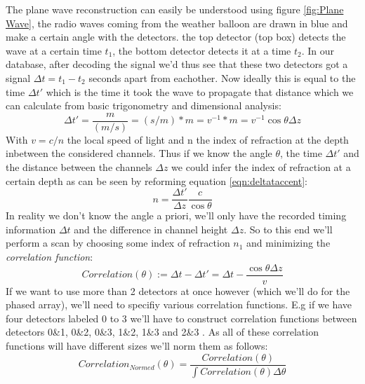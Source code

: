 \documentclass[11pt,a4paper,faculty=we,language=en,doctype=report]{cls/ugent-doc}
\begin{document}
The plane wave reconstruction can easily be understood using figure
\ref{fig:Plane Wave}, the radio waves coming from the weather balloon are drawn
in blue and make a certain angle with the detectors. the top detector (top box)
detects the wave at a certain time $t_1$, the bottom detector detects it at a
time $t_2$. In our database, after decoding the signal we'd thus see that these
two detectors got a signal $\Delta t = t_1 - t_2$ seconds apart from eachother.
Now ideally this is equal to the time $\Delta t'$ which is the time it took the
wave to propagate that distance which we can calculate from basic trigonometry
and dimensional analysis:
\begin{equation}
	\Delta t' = \frac{m}{(m/s)} = (s/m)*m = v^{-1} * m = v^{-1} \cos\theta \Delta z
	\label{eqn:deltataccent}
\end{equation}
With $v = c/n$ the local speed of light and n the index of refraction at the depth inbetween
the considered channels. 
Thus if we know the angle $\theta$, the time $\Delta t'$ and the distance between the channels $\Delta z$
we could infer the index of refraction at a certain depth as can be seen by reforming equation \ref{eqn:deltataccent}:
\begin{equation}
	n = \frac{\Delta t'}{\Delta z} \frac{c}{\cos\theta}
\end{equation}
In reality we don't know the angle a priori, we'll only have the recorded
timing information $\Delta t$ and the difference in channel height $\Delta z$.
So to this end we'll perform a scan by choosing some index of refraction $n_1$ and
minimizing the \textit{correlation function}:
\begin{equation}
	Correlation(\theta) := \Delta t - \Delta t' = \Delta t
	- \frac{\cos\theta \Delta z}{v}
  \label{eqn:PlaneWave}
\end{equation}
If we want to use more than 2 detectors at once however (which we'll do for the phased array), 
we'll need to specifiy various correlation functions.  E.g
if we have four detectors labeled 0 to 3 we'll have to construct correlation
functions between detectors 0\&1, 0\&2, 0\&3, 1\&2, 1\&3 and 2\&3 .  As all of
these correlation functions will have different sizes we'll norm them as
follows:
\begin{equation}
	Correlation_{Normed}(\theta) =
	\frac{Correlation(\theta)}{\int Correlation(\theta)\Delta
	\theta}
\end{equation}
\end{document}
